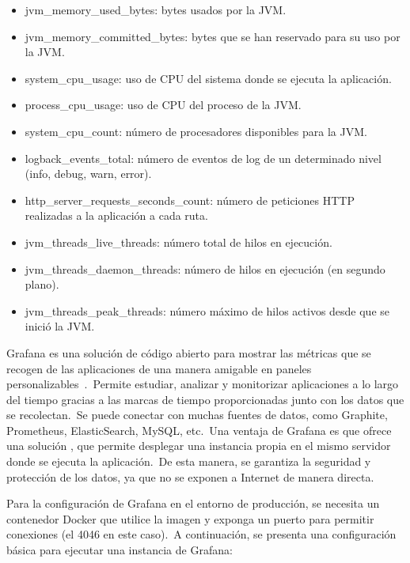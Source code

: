\begin{itemize}
	\item jvm\_memory\_used\_bytes: bytes usados por la JVM\@.
	\item jvm\_memory\_committed\_bytes: bytes que se han reservado para su uso por la JVM\@.
	\item system\_cpu\_usage: uso de CPU del sistema donde se ejecuta la aplicación.
	\item process\_cpu\_usage: uso de CPU del proceso de la JVM\@.
	\item system\_cpu\_count: número de procesadores disponibles para la JVM\@.
	\item logback\_events\_total: número de eventos de log de un determinado nivel (info, debug, warn, error).
	\item http\_server\_requests\_seconds\_count: número de peticiones HTTP realizadas a la aplicación a cada ruta.
	\item jvm\_threads\_live\_threads: número total de hilos en ejecución.
	\item jvm\_threads\_daemon\_threads: número de hilos en ejecución (en segundo plano).
	\item jvm\_threads\_peak\_threads: número máximo de hilos activos desde que se inició la JVM\@.
\end{itemize}
\label{itm:most-used-metrics}

Grafana es una solución de código abierto para mostrar las métricas que se recogen de las aplicaciones de una
manera amigable en paneles personalizables~\cite{what-is-grafana}.\ Permite estudiar, analizar y monitorizar
aplicaciones a lo largo del tiempo gracias a las marcas de tiempo proporcionadas junto con los datos que se
recolectan.\ Se puede conectar con muchas fuentes de datos, como Graphite, Prometheus, ElasticSearch, MySQL, etc.\
Una ventaja de Grafana es que ofrece una solución , que permite desplegar una instancia propia en
el mismo servidor donde se ejecuta la aplicación.\ De esta manera, se garantiza la seguridad y protección de los
datos, ya que no se exponen a Internet de manera directa.

Para la configuración de Grafana en el entorno de producción, se necesita un contenedor Docker que utilice la imagen
\monoFont{grafana/grafana-oss} y exponga un puerto para permitir conexiones (el 4046 en este caso).\ A continuación,
se presenta una configuración básica para ejecutar una instancia de Grafana:

